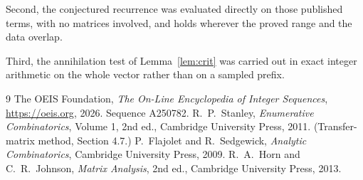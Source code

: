 \documentclass[11pt,a4paper]{article}
\theoremstyle{plain}
\theoremstyle{definition}
\begin{document}
Second, the conjectured recurrence was evaluated directly on those published terms, with no
matrices involved, and holds wherever the proved range and the data overlap.

Third, the annihilation test of Lemma~\ref{lem:crit} was carried out in exact integer
arithmetic on the whole vector rather than on a sampled prefix.

\begin{thebibliography}{9}
 The OEIS Foundation, \emph{The On-Line Encyclopedia of Integer
Sequences}, \url{https://oeis.org}, 2026. Sequence A250782.
 R.~P.~Stanley, \emph{Enumerative Combinatorics}, Volume 1, 2nd ed.,
Cambridge University Press, 2011. (Transfer-matrix method, Section 4.7.)
 P.~Flajolet and R.~Sedgewick, \emph{Analytic Combinatorics}, Cambridge
University Press, 2009.
 R.~A.~Horn and C.~R.~Johnson, \emph{Matrix Analysis}, 2nd ed., Cambridge
University Press, 2013.
\end{thebibliography}
\end{document}
